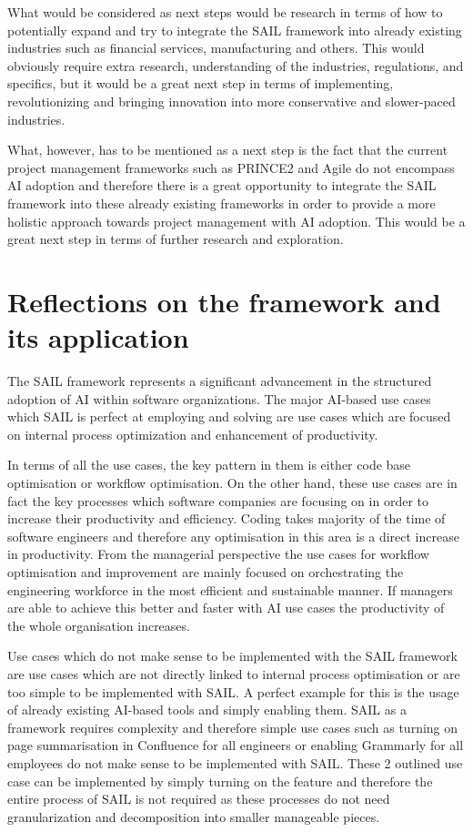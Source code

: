 \documentclass[]{imc-inf}
\begin{document}
What would be considered as next steps would be research in terms of how to potentially expand and try to integrate the SAIL framework into already existing industries such as financial services, manufacturing and others. This would obviously require extra research, understanding of the industries, regulations, and specifics, but it would be a great next step in terms of implementing, revolutionizing and bringing innovation into more conservative and slower-paced industries.



What, however, has to be mentioned as a next step is the fact that the current project management frameworks such as PRINCE2 and Agile do not encompass AI adoption and therefore there is a great opportunity to integrate the SAIL framework into these already existing frameworks in order to provide a more holistic approach towards project management with AI adoption. This would be a great next step in terms of further research and exploration.





\section{Reflections on the framework and its
	application}\label{reflections-on-the-framework-and-its-application}

The SAIL framework represents a significant advancement in the
structured adoption of AI within software organizations. The major AI-based use cases which SAIL is perfect at employing and solving are use
cases which are focused on internal process optimization and enhancement
of productivity. 

In terms of all the use cases, the key pattern in them is either
code base optimisation or workflow optimisation. On the other hand, these use
cases are in fact the key processes which software companies are
focusing on in order to increase their productivity and efficiency.
Coding takes majority of the time of software engineers and therefore
any optimisation in this area is a direct increase in productivity. From
the managerial perspective the use cases for workflow optimisation and
improvement are mainly focused on orchestrating the engineering
workforce in the most efficient and sustainable manner. If managers are
able to achieve this better and faster with AI use cases the
productivity of the whole organisation increases.

Use cases which do not make sense to be implemented with the SAIL
framework are use cases which are not directly linked to internal
process optimisation or are too simple to be implemented with SAIL. A
perfect example for this is the usage of already existing AI-based tools
and simply enabling them. SAIL as a framework requires complexity and
therefore simple use cases such as turning on page summarisation in
Confluence for all engineers or enabling Grammarly for all employees do
not make sense to be implemented with SAIL. These 2 outlined use case
can be implemented by simply turning on the feature and therefore the
entire process of SAIL is not required as these processes do not need
granularization and decomposition into smaller manageable pieces.
\end{document}
